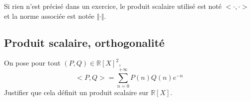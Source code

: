 \documentclass[a4paper,twoside,french,11pt]{VcCours}
\begin{document}

\tableofcontents
\separationTitre



Si rien n'est précisé dans un exercice, le produit scalaire utilisé est noté $< \cdot , \cdot >$ et la norme associée est notée $\Vert \cdot \Vert$.


\subsection{Produit scalaire, orthogonalité}



\begin{Exercice}{} On pose pour tout $(P,Q) \in \mathbb{R}[X]^2$,
$$ <P,Q> = \sum_{n=0}^{+ \infty} P(n) Q(n) e^{-n} $$
Justifier que cela définit un produit scalaire sur $\mathbb{R}[X]$.
\end{Exercice}

%
%
%
%
\end{document}
